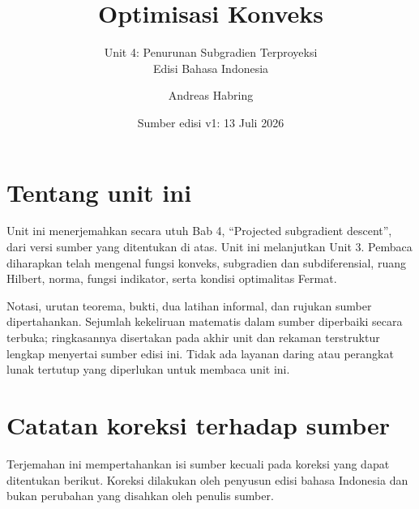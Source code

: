 \documentclass[indonesian]{shinybook}
\title{Optimisasi Konveks}
\subtitle{Unit 4: Penurunan Subgradien Terproyeksi\\Edisi Bahasa Indonesia}
\author{Andreas Habring}
\date{Sumber edisi v1: 13 Juli 2026}
\begin{document}
\maketitle

\frontmatter
\chapter*{Tentang unit ini}
Unit ini menerjemahkan secara utuh Bab 4, ``Projected subgradient descent'', dari versi sumber yang ditentukan di atas. Unit ini melanjutkan Unit 3. Pembaca diharapkan telah mengenal fungsi konveks, subgradien dan subdiferensial, ruang Hilbert, norma, fungsi indikator, serta kondisi optimalitas Fermat.

Notasi, urutan teorema, bukti, dua latihan informal, dan rujukan sumber dipertahankan. Sejumlah kekeliruan matematis dalam sumber diperbaiki secara terbuka; ringkasannya disertakan pada akhir unit dan rekaman terstruktur lengkap menyertai sumber edisi ini. Tidak ada layanan daring atau perangkat lunak tertutup yang diperlukan untuk membaca unit ini.

\tableofcontents
\mainmatter
\setcounter{chapter}{3}


\backmatter
\chapter*{Catatan koreksi terhadap sumber}
Terjemahan ini mempertahankan isi sumber kecuali pada koreksi yang dapat ditentukan berikut. Koreksi dilakukan oleh penyusun edisi bahasa Indonesia dan bukan perubahan yang disahkan oleh penulis sumber.
\end{document}
